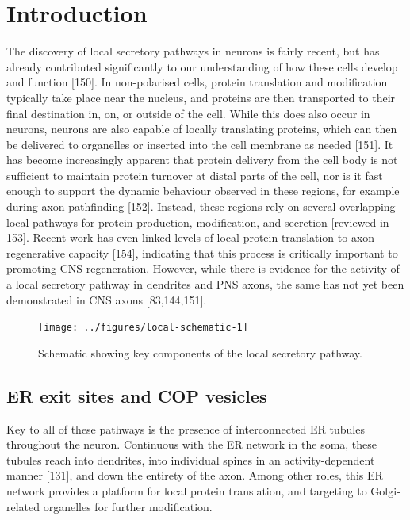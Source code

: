 \documentclass[
  12pt,
  a4paper,
]{book}
\renewcommand{\chaptermark}[1]{\markboth{#1}{}}
\begin{document}
\chaptermark{ER, ERGIC, and Golgi}

\hypertarget{introduction-2}{%
\section{Introduction}\label{introduction-2}}

The discovery of local secretory pathways in neurons is fairly recent, but has already contributed significantly to our understanding of how these cells develop and function {[}150{]}. In non-polarised cells, protein translation and modification typically take place near the nucleus, and proteins are then transported to their final destination in, on, or outside of the cell. While this does also occur in neurons, neurons are also capable of locally translating proteins, which can then be delivered to organelles or inserted into the cell membrane as needed {[}151{]}. It has become increasingly apparent that protein delivery from the cell body is not sufficient to maintain protein turnover at distal parts of the cell, nor is it fast enough to support the dynamic behaviour observed in these regions, for example during axon pathfinding {[}152{]}. Instead, these regions rely on several overlapping local pathways for protein production, modification, and secretion {[}reviewed in 153{]}. Recent work has even linked levels of local protein translation to axon regenerative capacity {[}154{]}, indicating that this process is critically important to promoting CNS regeneration. However, while there is evidence for the activity of a local secretory pathway in dendrites and PNS axons, the same has not yet been demonstrated in CNS axons {[}83,144,151{]}.

\begin{figure}
\texttt{[image: ../figures/local-schematic-1]} \caption[Schematic of the local secretory pathway]{Schematic showing key components of the local secretory pathway.}\label{fig:local-schematic}
\end{figure}

\hypertarget{er-exit-sites-and-cop-vesicles}{%
\subsection{ER exit sites and COP vesicles}\label{er-exit-sites-and-cop-vesicles}}

Key to all of these pathways is the presence of interconnected ER tubules throughout the neuron. Continuous with the ER network in the soma, these tubules reach into dendrites, into individual spines in an activity-dependent manner {[}131{]}, and down the entirety of the axon. Among other roles, this ER network provides a platform for local protein translation, and targeting to Golgi-related organelles for further modification.
\end{document}
